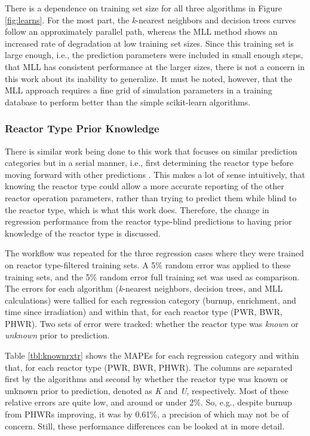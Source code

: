 There is a dependence on training set size for all three algorithms in Figure
\ref{fig:learns}. For the most part, the \textit{k}-nearest neighbors and
decision trees curves follow an approximately parallel path, whereas the
\gls{MLL} method shows an increased rate of degradation at low training set
sizes. Since this training set is large enough, i.e., the prediction parameters
were included in small enough steps, that \gls{MLL} has consistent performance
at the larger sizes, there is not a concern in this work about its inability to
generalize. It must be noted, however, that the \gls{MLL} approach requires a
fine grid of simulation parameters in a training database to perform better
than the simple scikit-learn algorithms.

\subsubsection{Reactor Type Prior Knowledge}
\label{sec:randerrD}

There is similar work being done to this work that focuses on similar
prediction categories but in a serial manner, i.e., first determining the
reactor type before moving forward with other predictions \cite{serial_ml}.
This makes a lot of sense intuitively, that knowing the reactor type could
allow a more accurate reporting of the other reactor operation parameters,
rather than trying to predict them while blind to the reactor type, which is
what this work does. Therefore, the change in regression performance from the
reactor type-blind predictions to having prior knowledge of the reactor type is
discussed.

The workflow was repeated for the three regression cases where they were
trained on reactor type-filtered training sets. A 5\% random error was applied
to these training sets, and the 5\% random error full training set was used as
comparison. The errors for each algorithm (\textit{k}-nearest neighbors,
decision trees, and \gls{MLL} calculations) were tallied for each regression
category (burnup, enrichment, and time since irradiation) and within that, for
each reactor type (\gls{PWR}, \gls{BWR}, \gls{PHWR}). Two sets of error were
tracked: whether the reactor type was \textit{known} or \textit{unknown} prior
to prediction.

Table \ref{tbl:knownrxtr} shows the \gls{MAPE}s for each regression category
and within that, for each reactor type (\gls{PWR}, \gls{BWR}, \gls{PHWR}).  The
columns are separated first by the algorithms and second by whether the reactor
type was known or unknown prior to prediction, denoted as \textit{K} and
\textit{U}, respectively. Most of these relative errors are quite low, and
around or under 2\%.  So, e.g., despite burnup from \gls{PHWR}s improving, it
was by 0.61\%, a precision of which may not be of concern. Still, these
performance differences can be looked at in more detail.  


